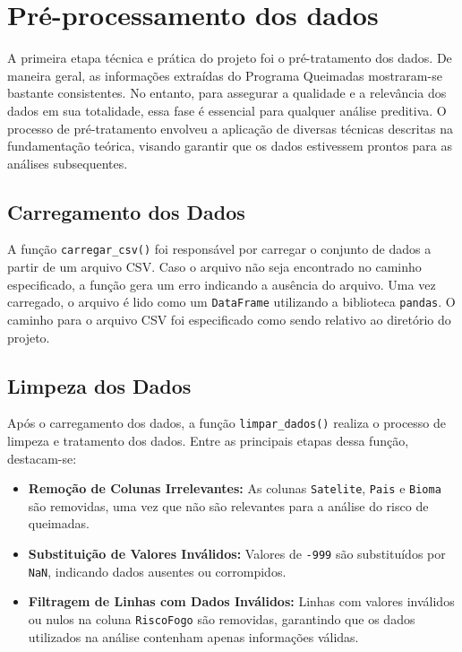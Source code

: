 \section{Pré-processamento dos dados}
\label{sec:metodologia_pre_processamento}

A primeira etapa técnica e prática do projeto foi o pré-tratamento dos dados. De maneira geral, as informações extraídas do Programa Queimadas mostraram-se bastante consistentes. No entanto, para assegurar a qualidade e a relevância dos dados em sua totalidade, essa fase é essencial para qualquer análise preditiva. O processo de pré-tratamento envolveu a aplicação de diversas técnicas descritas na fundamentação teórica, visando garantir que os dados estivessem prontos para as análises subsequentes.

\subsection{Carregamento dos Dados}

A função \texttt{carregar\_csv()} foi responsável por carregar o conjunto de dados a partir de um arquivo CSV. Caso o arquivo não seja encontrado no caminho especificado, a função gera um erro indicando a ausência do arquivo. Uma vez carregado, o arquivo é lido como um \texttt{DataFrame} utilizando a biblioteca \texttt{pandas}. O caminho para o arquivo CSV foi especificado como sendo relativo ao diretório do projeto.

\subsection{Limpeza dos Dados}

Após o carregamento dos dados, a função \texttt{limpar\_dados()} realiza o processo de limpeza e tratamento dos dados. Entre as principais etapas dessa função, destacam-se:

\begin{itemize}
    \item \textbf{Remoção de Colunas Irrelevantes:} As colunas \texttt{Satelite}, \texttt{Pais} e \texttt{Bioma} são removidas, uma vez que não são relevantes para a análise do risco de queimadas.
    \item \textbf{Substituição de Valores Inválidos:} Valores de \texttt{-999} são substituídos por \texttt{NaN}, indicando dados ausentes ou corrompidos.
    \item \textbf{Filtragem de Linhas com Dados Inválidos:} Linhas com valores inválidos ou nulos na coluna \texttt{RiscoFogo} são removidas, garantindo que os dados utilizados na análise contenham apenas informações válidas.
\end{itemize}

